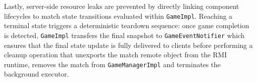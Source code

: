 \documentclass[11pt,a4paper]{article}
\begin{document}
Lastly, server-side resource leaks are prevented by directly linking component lifecycles to match state transitions evaluated within \texttt{GameImpl}. Reaching a terminal state triggers a deterministic teardown sequence: once game completion is detected, \texttt{GameImpl} transfers the final snapshot to \texttt{GameEventNotifier} which ensures that the final state update is fully delivered to clients before performing a cleanup operation that unexports the match remote object from the RMI runtime, removes the match from \texttt{GameManagerImpl} and terminates the background executor.
\end{document}
